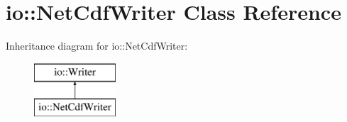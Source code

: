 \hypertarget{classio_1_1NetCdfWriter}{\section{io\-:\-:Net\-Cdf\-Writer Class Reference}
\label{classio_1_1NetCdfWriter}
}
Inheritance diagram for io\-:\-:Net\-Cdf\-Writer\-:\begin{figure}[H]
\begin{center}
\leavevmode
\includegraphics[height=2.000000cm]{classio_1_1NetCdfWriter}
\end{center}
\end{figure}
